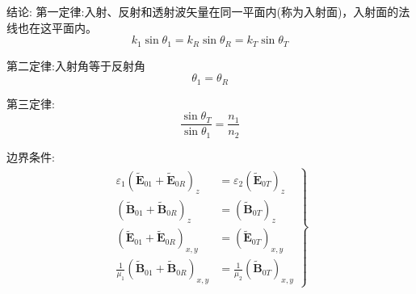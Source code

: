 结论:
第一定律:入射、反射和透射波矢量在同一平面内(称为入射面)，入射面的法线也在这平面内。
\begin{equation}
    k_1\sin\theta_1=k_R\sin\theta_R=k_T\sin\theta_T
\end{equation}

第二定律:入射角等于反射角
\begin{equation}
    \theta_1=\theta_R
\end{equation}

第三定律:
\begin{equation}
    \frac{\sin\theta_T}{\sin\theta_1}=\frac{n_1}{n_2}
\end{equation}

边界条件:
\begin{align*}
\left.\begin{aligned}
\varepsilon_1\left(\widetilde{\boldsymbol{E}}_{01}+\widetilde{\boldsymbol{E}}_{0R}\right)_z&= \varepsilon_2\left(\widetilde{\boldsymbol{E}}_{0T}\right)_z\\
\left(\widetilde{\boldsymbol{B}}_{01}+\widetilde{\boldsymbol{B}}_{0R}\right)_z&= \left(\widetilde{\boldsymbol{B}}_{0T}\right)_z\\
\left(\widetilde{\boldsymbol{E}}_{01}+\widetilde{\boldsymbol{E}}_{0R}\right)_{x,y}&= \left(\widetilde{\boldsymbol{E}}_{0T}\right)_{x,y}\\
\frac{1}{\mu_1}\left(\widetilde{\boldsymbol{B}}_{01}+\widetilde{\boldsymbol{B}}_{0R}\right)_{x,y}&= \frac{1}{\mu_2}\left(\widetilde{\boldsymbol{B}}_{0T}\right)_{x,y}
\end{aligned}\right\}
\end{align*}


